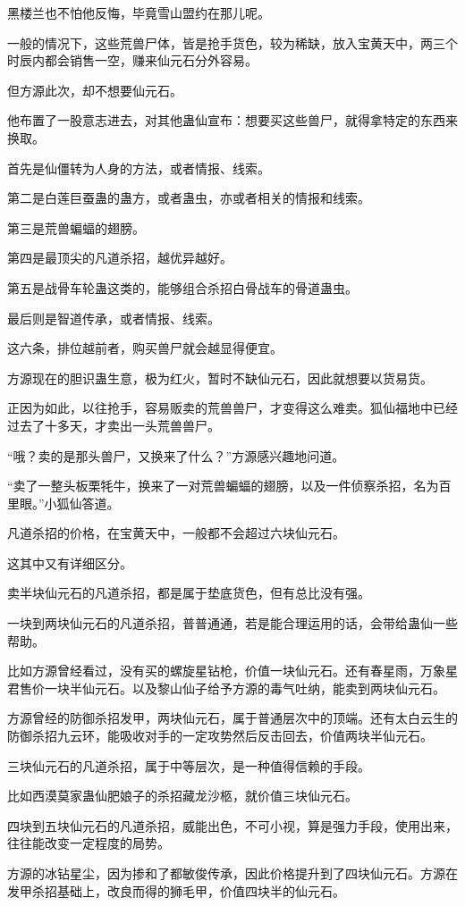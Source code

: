 \begin{this_body}
黑楼兰也不怕他反悔，毕竟雪山盟约在那儿呢。

一般的情况下，这些荒兽尸体，皆是抢手货色，较为稀缺，放入宝黄天中，两三个时辰内都会销售一空，赚来仙元石分外容易。

但方源此次，却不想要仙元石。

他布置了一股意志进去，对其他蛊仙宣布：想要买这些兽尸，就得拿特定的东西来换取。

首先是仙僵转为人身的方法，或者情报、线索。

第二是白莲巨蚕蛊的蛊方，或者蛊虫，亦或者相关的情报和线索。

第三是荒兽蝙蝠的翅膀。

第四是最顶尖的凡道杀招，越优异越好。

第五是战骨车轮蛊这类的，能够组合杀招白骨战车的骨道蛊虫。

最后则是智道传承，或者情报、线索。

这六条，排位越前者，购买兽尸就会越显得便宜。

方源现在的胆识蛊生意，极为红火，暂时不缺仙元石，因此就想要以货易货。

正因为如此，以往抢手，容易贩卖的荒兽兽尸，才变得这么难卖。狐仙福地中已经过去了十多天，才卖出一头荒兽兽尸。

“哦？卖的是那头兽尸，又换来了什么？”方源感兴趣地问道。

“卖了一整头板栗牦牛，换来了一对荒兽蝙蝠的翅膀，以及一件侦察杀招，名为百里眼。”小狐仙答道。

凡道杀招的价格，在宝黄天中，一般都不会超过六块仙元石。

这其中又有详细区分。

卖半块仙元石的凡道杀招，都是属于垫底货色，但有总比没有强。

一块到两块仙元石的凡道杀招，普普通通，若是能合理运用的话，会带给蛊仙一些帮助。

比如方源曾经看过，没有买的螺旋星钻枪，价值一块仙元石。还有春星雨，万象星君售价一块半仙元石。以及黎山仙子给予方源的毒气吐纳，能卖到两块仙元石。

方源曾经的防御杀招发甲，两块仙元石，属于普通层次中的顶端。还有太白云生的防御杀招九云环，能吸收对手的一定攻势然后反击回去，价值两块半仙元石。

三块仙元石的凡道杀招，属于中等层次，是一种值得信赖的手段。

比如西漠莫家蛊仙肥娘子的杀招藏龙沙柩，就价值三块仙元石。

四块到五块仙元石的凡道杀招，威能出色，不可小视，算是强力手段，使用出来，往往能改变一定程度的局势。

方源的冰钻星尘，因为掺和了都敏俊传承，因此价格提升到了四块仙元石。方源在发甲杀招基础上，改良而得的狮毛甲，价值四块半的仙元石。


\end{this_body}
